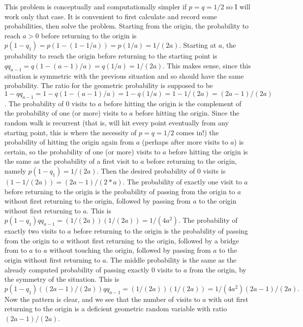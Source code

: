 \begin{problem}
\begin{sol}
This problem is conceptually and computationally simpler if $p
= q = 1/2$ so I will work only that case.
It is convenient to first calculate and record
some probabilities, then solve the problem.
Starting from the origin, the probability to reach $a>0$ before
returning to the origin is $p (1-q_1) = p ( 1 - (1 - 1/a)) =
p (1/a) = 1/(2a)$.
Starting at $a$, the probability to reach the origin before
returning to the starting point is $q q_{a-1} = q ( 1 - (a-1)/a)
= q (1/a) = 1/(2a)$.  This makes sense, since this situation is
symmetric with the previous situation and so should have the
same probability.
The ratio for the geometric probability is supposed to be $1 -
q q_{a-1} = 1 - q (1 - (a-1)/a) = 1 - q (1/a) = 1 - 1/(2a) =
(2a-1)/(2a)$.
The probability of $0$ visits to $a$ before hitting the
origin is the complement of the probability of one (or more)
visits to $a$ before hitting the origin.  Since the random
walk is recurrent (that is, will hit every point eventually
from any starting point, this is where the necessity of $p = q
=1/2$ comes in!) the probability of hitting the origin again
from $a$ (perhaps after more visits to $a$) is certain, so the
probability of one (or more) visits to $a$ before hitting the
origin is the same as the probability of a first visit to $a$
before returning to the origin,
namely $p (1-q_1) = 1/(2 a)$.  Then the desired probability of $0$
visits is $(1 - 1/(2a)) = (2a-1)/(2*a)$.
The probability of exactly one visit to $a$ before returning to
the origin is the
probability of passing from the origin to $a$ without first
returning to the origin, followed by passing from $a$ to the
origin without first returning to $a$.  This is
$p (1-q_1) q q_{a-1} = ( 1/(2 a) ) ( 1/(2 a) ) = 1/(4 a^2)$.
The probability of exactly two visits to $a$ before
returning to the origin is the
probability of passing from the origin to $a$ without first
returning to the origin, followed by a bridge from to $a$ to $a$
without touching the origin, followed by passing from $a$ to the
origin without first returning to $a$.  The middle probability
is the same as the already computed probability of passing
exactly $0$ visits to $a$ from the origin, by the symmetry of the
situation.  This is
\[
  p (1-q_1) ( (2 a-1)/(2 a) )   q q_{a-1} = ( 1/(2 a) ) (
  1/(2 a) ) = 1/(4 a^2) (2 a-1)/(2 a).
\]
Now the pattern is clear, and we see that the number of visits
to $a$ with out first returning to the origin is a deficient geometric
random variable with ratio $(2a-1)/(2a)$.


\end{sol}
\end{problem}
